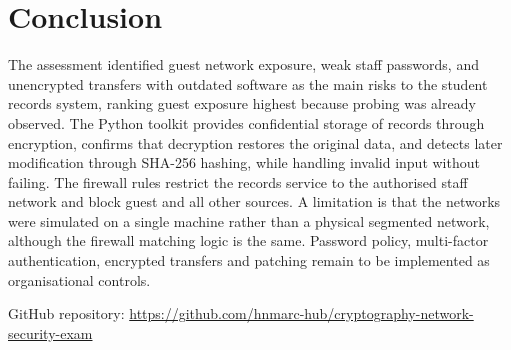 \documentclass[11pt]{article}
\begin{document}


\section{Conclusion}
The assessment identified guest network exposure, weak staff passwords, and unencrypted transfers with outdated software as the main risks to the student records system, ranking guest exposure highest because probing was already observed. The Python toolkit provides confidential storage of records through encryption, confirms that decryption restores the original data, and detects later modification through SHA-256 hashing, while handling invalid input without failing. The firewall rules restrict the records service to the authorised staff network and block guest and all other sources. A limitation is that the networks were simulated on a single machine rather than a physical segmented network, although the firewall matching logic is the same. Password policy, multi-factor authentication, encrypted transfers and patching remain to be implemented as organisational controls.

\vspace{1em}
\noindent GitHub repository: \url{https://github.com/hnmarc-hub/cryptography-network-security-exam}
\end{document}
